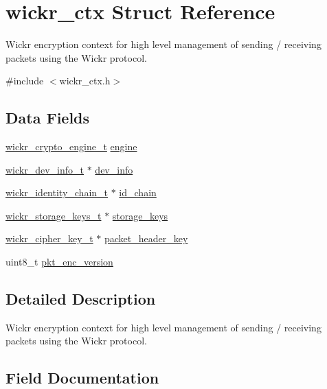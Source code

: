 \hypertarget{structwickr__ctx}{}\section{wickr\+\_\+ctx Struct Reference}
\label{structwickr__ctx}


Wickr encryption context for high level management of sending / receiving packets using the Wickr protocol.  




{\ttfamily \#include $<$wickr\+\_\+ctx.\+h$>$}

\subsection*{Data Fields}
\begin{DoxyCompactItemize}
\item 
\hyperlink{structwickr__crypto__engine}{wickr\+\_\+crypto\+\_\+engine\+\_\+t} \hyperlink{structwickr__ctx_a244c238ad74f2dbcddc280822d1fb93f}{engine}
\item 
\hyperlink{structwickr__dev__info}{wickr\+\_\+dev\+\_\+info\+\_\+t} $\ast$ \hyperlink{structwickr__ctx_a043ea3b027c4d27909f77bb195550b11}{dev\+\_\+info}
\item 
\hyperlink{structwickr__identity__chain}{wickr\+\_\+identity\+\_\+chain\+\_\+t} $\ast$ \hyperlink{structwickr__ctx_a044a292ab5cbba50fd3ec2f5bf7a00ef}{id\+\_\+chain}
\item 
\hyperlink{structwickr__storage__keys}{wickr\+\_\+storage\+\_\+keys\+\_\+t} $\ast$ \hyperlink{structwickr__ctx_ab6d3ad69a6a16c0f582186b9d8461b66}{storage\+\_\+keys}
\item 
\hyperlink{structwickr__cipher__key}{wickr\+\_\+cipher\+\_\+key\+\_\+t} $\ast$ \hyperlink{structwickr__ctx_a86da8359c914b1fec0d60e1c64fcf048}{packet\+\_\+header\+\_\+key}
\item 
uint8\+\_\+t \hyperlink{structwickr__ctx_ad43117fbe3f70681f0ab982b06c6cd75}{pkt\+\_\+enc\+\_\+version}
\end{DoxyCompactItemize}


\subsection{Detailed Description}
Wickr encryption context for high level management of sending / receiving packets using the Wickr protocol. 

\subsection{Field Documentation}
\mbox{\label{structwickr__ctx_a043ea3b027c4d27909f77bb195550b11}} 

